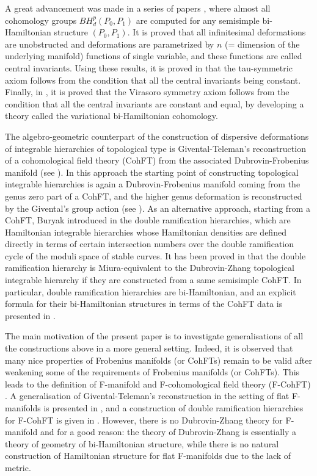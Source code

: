 \documentclass[11pt,a4paper]{amsart}
\numberwithin{equation}{section}
\numberwithin{equation}{section}
\begin{document}
A great advancement was made in a series of papers \cite{DLZ13,CPS,CKS}, where almost all cohomology groups $BH^p_d(P_0,P_1)$ are computed for any semisimple bi-Hamiltonian structure $(P_0,P_1)$. It is proved that all infinitesimal deformations are unobstructed and deformations are parametrized by $n$ (= dimension of the underlying manifold) functions of single variable, and these functions are called central invariants.
Using these results, it is proved in \cite{FL12,DLZ18} that the tau-symmetric axiom follows from the condition that all the central invariants being constant. Finally, in \cite{LWZ1,LWZ2,LWZ3,LWZ5}, it is proved that the Virasoro symmetry axiom follows from the condition that all the central invariants are constant and equal, by developing a theory called the variational bi-Hamiltonian cohomology. 

The algebro-geometric counterpart
  of the construction of dispersive deformations of integrable hierarchies of topological type is Givental-Teleman's reconstruction of a cohomological field theory (CohFT) from the associated Dubrovin-Frobenius manifold (see \cite{Gi01,Te12}). In this approach the starting point of constructing topological integrable hierarchies is again a Dubrovin-Frobenius manifold coming from the genus zero part of a CohFT, and the higher genus deformation is reconstructed by the Givental's group action (see \cite{BPS}). As an alternative approach, starting from a CohFT, Buryak introduced in \cite{B15} the double ramification hierarchies, which are Hamiltonian integrable hierarchies whose Hamiltonian densities are defined directly in terms of certain intersection numbers over the double ramification cycle of the moduli space of stable curves. It has been proved in \cite{BLS} that the double ramification hierarchy is Miura-equivalent to the Dubrovin-Zhang topological integrable hierarchy if they are constructed from a same semisimple CohFT. In particular, double ramification hierarchies are bi-Hamiltonian, and an explicit formula for their bi-Hamiltonian structures in terms of the CohFT data is presented in \cite{BRS,BR}.

The main motivation of the present paper is to investigate generalisations of all the constructions above in a more general setting. Indeed, it is observed that many nice properties of Frobenius manifolds (or CohFTs) remain to be valid after weakening some of the requirements of Frobenius manifolds (or CohFTs). This leads to the definition of F-manifold \cite{HM} and F-cohomological field theory (F-CohFT) \cite{ABLR1,ABLR2}. A generalisation of Givental-Teleman's reconstruction in the setting of flat F-manifolds is presented in \cite{ABLR1}, and a construction of double ramification hierarchies for F-CohFT is given in \cite{ABLR2}. However, there is no Dubrovin-Zhang theory for F-manifold and for a good reason: the theory of Dubrovin-Zhang is essentially a theory of geometry of bi-Hamiltonian structure, while there is no natural construction of Hamiltonian structure for flat F-manifolds due to the lack of metric. 
\end{document}
